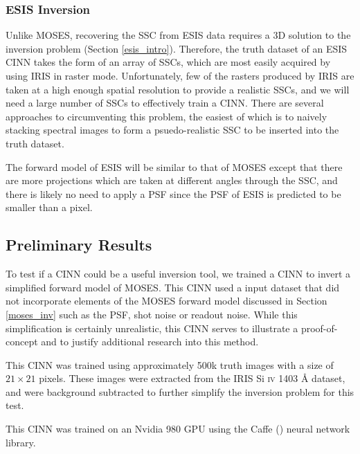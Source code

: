 \documentclass[10pt, letter]{article}
\begin{document}
			\subsubsection{ESIS Inversion}
			
				Unlike MOSES, recovering the SSC from ESIS data requires a 3D solution to the inversion problem (Section \ref{esis_intro}). Therefore, the truth dataset of an ESIS CINN takes the form of an array of SSCs, which are most easily acquired by using IRIS in raster mode. Unfortunately, few of the rasters produced by IRIS are taken at a high enough spatial resolution to provide a realistic SSCs, and we will need a large number of SSCs to effectively train a CINN. There are several approaches to circumventing this problem, the easiest of which is to naively stacking spectral images to form a psuedo-realistic SSC to be inserted into the truth dataset. 
				
				The forward model of ESIS will be similar to that of MOSES except that there are more projections which are taken at different angles through the SSC, and there is likely no need to apply a PSF since the PSF of ESIS is predicted to be smaller than a pixel.
		
		\subsection{Preliminary Results}
		
			To test if a CINN could be a useful inversion tool, we trained a CINN to invert a simplified forward model of MOSES. This CINN used a input dataset that did not incorporate elements of the MOSES forward model discussed in Section \ref{moses_inv} such as the PSF, shot noise or readout noise. While this simplification is certainly unrealistic, this CINN serves to illustrate a proof-of-concept and to justify additional research into this method.
			
			This CINN was trained using approximately 500k truth images with a size of $21 \times 21$ pixels. These images were extracted from the IRIS Si \textsc{iv} 1403 \AA{} dataset, and were background subtracted to further simplify the inversion problem for this test.
			
			This CINN was trained on an Nvidia 980 GPU using the Caffe (\cite{jia2014caffe}) neural network library. 
			
\end{document}
